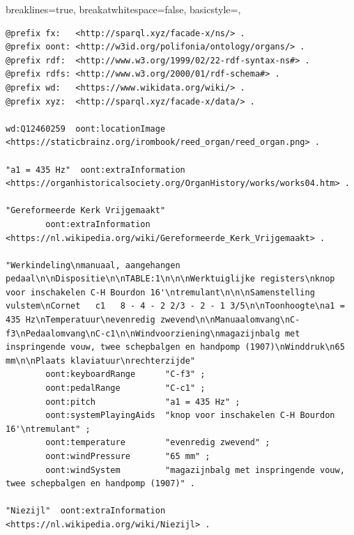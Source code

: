 \lstset
{
    breaklines=true,
    breakatwhitespace=false,
    basicstyle=\linespread{1}\ttfamily,
}
\begin{lstlisting}[caption={Part14\_000Niezijl}]
@prefix fx:   <http://sparql.xyz/facade-x/ns/> .
@prefix oont: <http://w3id.org/polifonia/ontology/organs/> .
@prefix rdf:  <http://www.w3.org/1999/02/22-rdf-syntax-ns#> .
@prefix rdfs: <http://www.w3.org/2000/01/rdf-schema#> .
@prefix wd:   <https://www.wikidata.org/wiki/> .
@prefix xyz:  <http://sparql.xyz/facade-x/data/> .

wd:Q12460259  oont:locationImage  <https://staticbrainz.org/irombook/reed_organ/reed_organ.png> .

"a1 = 435 Hz"  oont:extraInformation  <https://organhistoricalsociety.org/OrganHistory/works/works04.htm> .

"Gereformeerde Kerk Vrijgemaakt"
        oont:extraInformation  <https://nl.wikipedia.org/wiki/Gereformeerde_Kerk_Vrijgemaakt> .

"Werkindeling\nmanuaal, aangehangen pedaal\n\nDispositie\n\nTABLE:1\n\n\nWerktuiglijke registers\nknop voor inschakelen C-H Bourdon 16'\ntremulant\n\n\nSamenstelling vulstem\nCornet   c1   8 - 4 - 2 2/3 - 2 - 1 3/5\n\nToonhoogte\na1 = 435 Hz\nTemperatuur\nevenredig zwevend\n\nManuaalomvang\nC-f3\nPedaalomvang\nC-c1\n\nWindvoorziening\nmagazijnbalg met inspringende vouw, twee schepbalgen en handpomp (1907)\nWinddruk\n65 mm\n\nPlaats klaviatuur\nrechterzijde"
        oont:keyboardRange      "C-f3" ;
        oont:pedalRange         "C-c1" ;
        oont:pitch              "a1 = 435 Hz" ;
        oont:systemPlayingAids  "knop voor inschakelen C-H Bourdon 16'\ntremulant" ;
        oont:temperature        "evenredig zwevend" ;
        oont:windPressure       "65 mm" ;
        oont:windSystem         "magazijnbalg met inspringende vouw, twee schepbalgen en handpomp (1907)" .

"Niezijl"  oont:extraInformation  <https://nl.wikipedia.org/wiki/Niezijl> .


\end{lstlisting}

